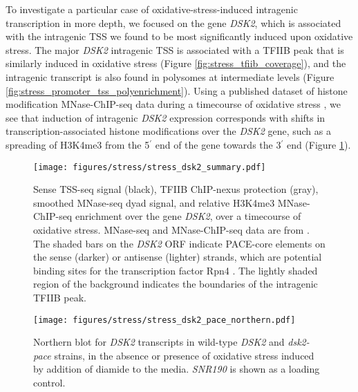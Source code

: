 To investigate a particular case of oxidative-stress-induced intragenic transcription in more depth, we focused on the gene \textit{DSK2}, which is associated with the intragenic TSS we found to be most significantly induced upon oxidative stress.
The major \textit{DSK2} intragenic TSS is associated with a TFIIB peak that is similarly induced in oxidative stress (Figure \ref{fig:stress_tfiib_coverage}), and the intragenic transcript is also found in polysomes at intermediate levels (Figure \ref{fig:stress_promoter_tss_polyenrichment}).
Using a published dataset of histone modification MNase-ChIP-seq data during a timecourse of oxidative stress \citep{weiner2015}, we see that induction of intragenic \textit{DSK2} expression corresponds with shifts in transcription-associated histone modifications over the \textit{DSK2} gene, such as a spreading of H3K4me3 from the 5$^\prime$ end of the gene towards the 3$^\prime$ end (Figure \ref{fig:stress_dsk2_summary}).
\begin{figure}[h]
    \texttt{[image: figures/stress/stress\_dsk2\_summary.pdf]}
    \caption[Sense TSS-seq signal, TFIIB ChIP-nexus protection, and MNase-ChIP-seq data at the \textit{DSK2} gene, over an oxidative stress timecourse.]{Sense TSS-seq signal (black), TFIIB ChIP-nexus protection (gray), smoothed MNase-seq dyad signal, and relative H3K4me3 MNase-ChIP-seq enrichment over the gene \textit{DSK2}, over a timecourse of oxidative stress. MNase-seq and MNase-ChIP-seq data are from \citet{weiner2015}. The shaded bars on the \textit{DSK2} ORF indicate PACE-core elements on the sense (darker) or antisense (lighter) strands, which are potential binding sites for the transcription factor Rpn4 \citep{shirozu2015}. The lightly shaded region of the background indicates the boundaries of the intragenic TFIIB peak.}
    \label{fig:stress_dsk2_summary}
\end{figure}

\begin{wrapfigure}[9]{r}{3in}
    \centering
    \texttt{[image: figures/stress/stress\_dsk2\_pace\_northern.pdf]}
    \caption[Northern blot for \textit{DSK2} transcripts in wild-type \textit{DSK2} and \textit{dsk2-pace} strains, in the absence or presence of oxidative stress.]{Northern blot for \textit{DSK2} transcripts in wild-type \textit{DSK2} and \textit{dsk2-pace} strains, in the absence or presence of oxidative stress induced by addition of diamide to the media. \textit{SNR190} is shown as a loading control.}
    \label{fig:stress_dsk2_pace_northern}
\end{wrapfigure}

